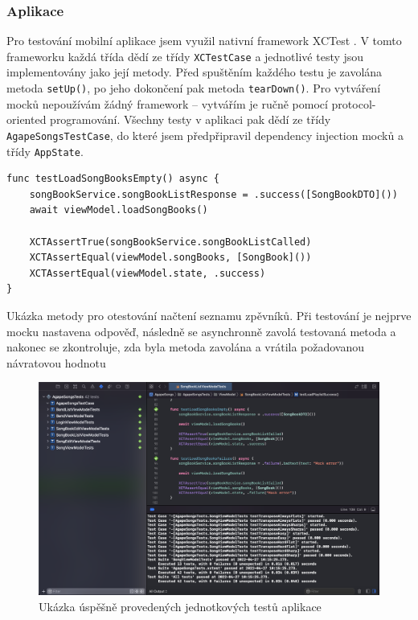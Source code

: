 \subsubsection{Aplikace}

Pro testování mobilní aplikace jsem využil nativní framework XCTest \cite{xctest}. V tomto frameworku každá třída dědí ze třídy \texttt{XCTestCase} a jednotlivé testy jsou implementovány jako její metody. Před spuštěním každého testu je zavolána metoda \texttt{setUp()}, po jeho dokončení pak metoda \texttt{tearDown()}. Pro vytváření mocků nepoužívám žádný framework -- vytvářím je ručně pomocí protocol-oriented programování. Všechny testy v aplikaci pak dědí ze třídy \texttt{AgapeSongsTestCase}, do které jsem předpřipravil dependency injection mocků a třídy \texttt{AppState}.

\begin{listing}[H]
\begin{verbatim}
func testLoadSongBooksEmpty() async {
    songBookService.songBookListResponse = .success([SongBookDTO]())
    await viewModel.loadSongBooks()
    
    XCTAssertTrue(songBookService.songBookListCalled)
    XCTAssertEqual(viewModel.songBooks, [SongBook]())
    XCTAssertEqual(viewModel.state, .success)
}
\end{verbatim}
\caption[Ukázka metody pro otestování načtení seznamu zpěvníků v aplikaci]{Ukázka metody pro otestování načtení seznamu zpěvníků. Při testování je nejprve mocku nastavena odpověď, následně se asynchronně zavolá testovaná metoda a nakonec se zkontroluje, zda byla metoda zavolána a vrátila požadovanou návratovou hodnotu}
\end{listing}

\begin{figure}[H]
    \includegraphics[width=\textwidth]{images/6-testovani/6-2-unit-test-aplikace.png}
    \caption{Ukázka úspěšně provedených jednotkových testů aplikace}
\end{figure}

